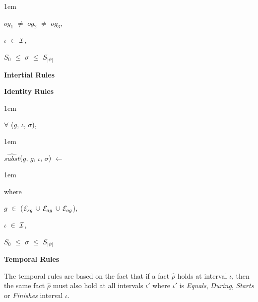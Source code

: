 \documentclass[11pt]{report}
\newenvironment{vquote}
{
  \begin{list}{}{\leftmargin 1em}\item[]
}
{
  \end{list}
}
\begin{document}
\begin{itemize}
\begin{itemize}
\begin{vquote}
                    \hspace{1em}
                    $og_{1}$ $\neq$ $og_{2}$ $\neq$ $og_{3}$,

                    \hspace{1em}
                    $\iota$ $\in$ ${\cal I}$,

                    \hspace{1em}
                    $S_{0}$ $\leq$ $\sigma$ $\leq$ $S_{|\psi|}$
                  \end{vquote}
              \end{itemize}
            
            \item
              {\bf Intertial Rules}
            
            \item
              {\bf Identity Rules}

              \begin{vquote}
                $\forall$ ($g$, $\iota$, $\sigma$),
              \end{vquote}

              \begin{vquote}
                $\hat{subst}$($g$, $g$, $\iota$, $\sigma$) $\leftarrow$
              \end{vquote}

              \begin{vquote}
                where

                \hspace{1em}
                $g$ $\in$ (${\cal E}_{sg}$ $\cup$ ${\cal E}_{ag}$ $\cup$ ${\cal E}_{og}$),

                \hspace{1em}
                $\iota$ $\in$ ${\cal I}$,

                \hspace{1em}
                $S_{0}$ $\leq$ $\sigma$ $\leq$ $S_{|\psi|}$
              \end{vquote}
            
            \item
              {\bf Temporal Rules}

              The temporal rules are based on the fact that if a fact
              $\hat{\rho}$ holds at interval $\iota$, then the same fact
              $\hat{\rho}$ must also hold at all intervals $\iota'$ where
              $\iota'$ is {\em Equals}, {\em During}, {\em Starts} or
              {\em Finishes} interval $\iota$.


\end{itemize}
\end{document}
